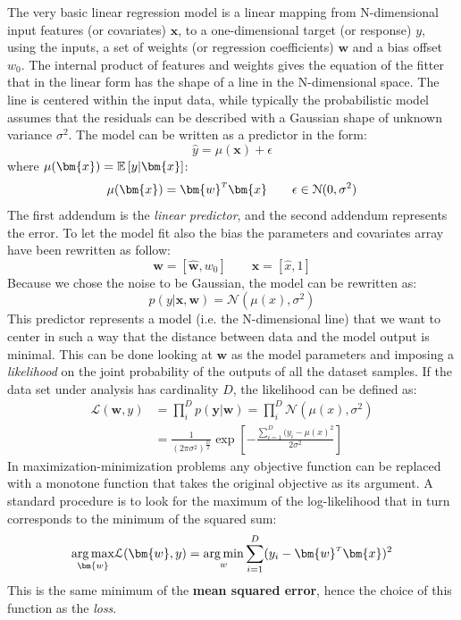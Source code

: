 The very basic linear regression model is a linear mapping from N-dimensional input features (or covariates) $\bm{x}$, to a one-dimensional target (or response) $y$, using the inputs, a set of weights (or regression coefficients) $\bm{w}$ and a bias offset $w_0$. The internal product of features and weights gives the equation of the fitter that in the linear form has the shape of a line in the N-dimensional space. The line is centered within the input data, while typically the probabilistic model assumes that the residuals can be described with a Gaussian shape of unknown variance $\sigma^2$. The model can be written as a predictor in the form:
\begin{equation}
    \hat{y} = \mu(\bm{x}) + \epsilon
\end{equation}
where $\mu(\bm{x}) = \expectation{y|\bm{x}}$:
\begin{equation}
     \mu(\bm{x}) = \transpose{\bm{w}}\bm{x} \qquad  \epsilon \in \mathcal{N}(0,\sigma^2)
\end{equation}
The first addendum is the \textit{linear predictor}, and the second addendum represents the error. To let the model fit also the bias the parameters and covariates array have been rewritten as follow:
\begin{equation}
    \bm{w} = [\hat{\bm{w}},w_0] \qquad \bm{x} = [\hat{x}, 1]
\end{equation}
Because we chose the noise to be Gaussian, the model can be rewritten as:
\begin{equation}
    p(y|\bm{x},\bm{w}) = \mathcal{N}(\mu(x), \sigma^2)
\end{equation}
This predictor represents a model (i.e. the N-dimensional line) that we want to center in such a way that the distance between data and the model output is minimal.
This can be done looking at $\bm{w}$ as the model parameters and imposing a \textit{likelihood} on the joint probability of the outputs of all the dataset samples. If the data set under analysis has cardinality $D$, the likelihood can be defined as:
\begin{align}
    \mathcal{L}(\bm{w}, y) &= \prod_i^D p(\bm{y}|\bm{w}) = \prod_i^D \mathcal{N}(\mu(x),\sigma^2) \\
    &= \frac{1}{(2\pi \sigma^2)^{\frac{D}{2}}} \exp \left[  -\frac{\sum_{i=1}^D (y_i-\mu(x)^2}{2\sigma^2} \right]
\end{align}
In maximization-minimization problems any objective function can be replaced with a monotone function that takes the original objective as its argument. A standard procedure is to look for the maximum of the log-likelihood that in turn corresponds to the minimum of the squared sum:
\begin{equation}
    \argmax{\bm{w}} \mathcal{L}(\bm{w},y) = \argmin{w} \sum_{i=1}^D (y_i - \transpose{\bm{w}}\bm{x})^2
\end{equation}
This is the same minimum of the \textbf{mean squared error}, hence the choice of this function as the \textit{loss}.

